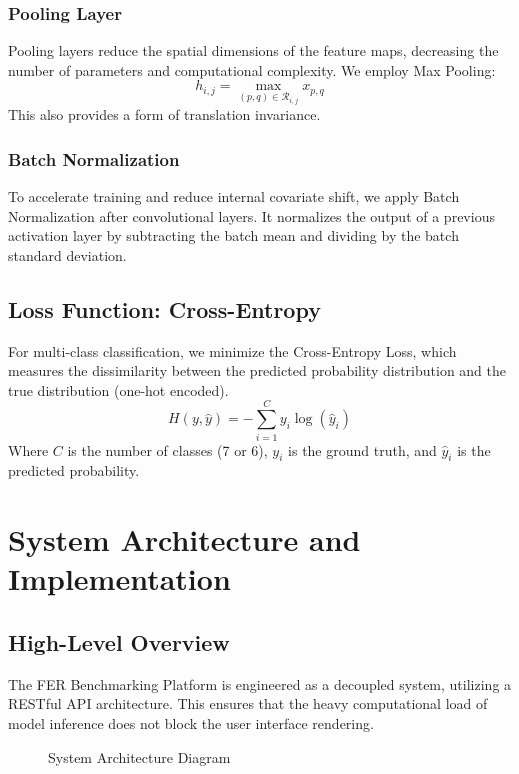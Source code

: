 \documentclass[a4paper,12pt]{article}
\begin{document}
\subsubsection{Pooling Layer}
Pooling layers reduce the spatial dimensions of the feature maps, decreasing the number of parameters and computational complexity. We employ Max Pooling:
\begin{equation}
    h_{i,j} = \max_{(p,q) \in \mathcal{R}_{i,j}} x_{p,q}
\end{equation}
This also provides a form of translation invariance.

\subsubsection{Batch Normalization}
To accelerate training and reduce internal covariate shift, we apply Batch Normalization after convolutional layers. It normalizes the output of a previous activation layer by subtracting the batch mean and dividing by the batch standard deviation.

\subsection{Loss Function: Cross-Entropy}
For multi-class classification, we minimize the Cross-Entropy Loss, which measures the dissimilarity between the predicted probability distribution and the true distribution (one-hot encoded).
\begin{equation}
    H(y, \hat{y}) = - \sum_{i=1}^{C} y_i \log(\hat{y}_i)
\end{equation}
Where $C$ is the number of classes (7 or 6), $y_i$ is the ground truth, and $\hat{y}_i$ is the predicted probability.

\section{System Architecture and Implementation}

\subsection{High-Level Overview}
The FER Benchmarking Platform is engineered as a decoupled system, utilizing a RESTful API architecture. This ensures that the heavy computational load of model inference does not block the user interface rendering.

\begin{figure}[H]
    \centering
    \caption{System Architecture Diagram}
    \label{fig:sys_arch}
\end{figure}
\end{document}
